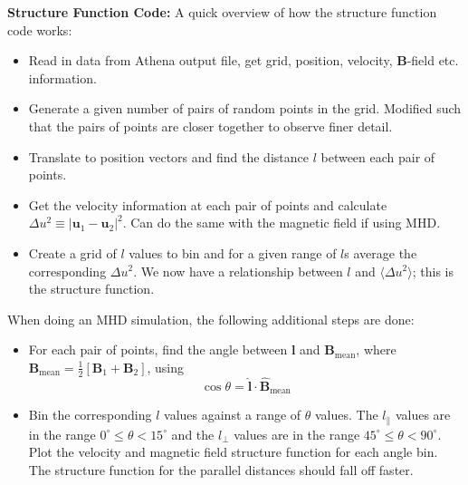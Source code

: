 \documentclass[12pt,letterpaper]{article}
\newcommand{\B}[1]{\mathbf{#1}}
\begin{document}
  \textbf{Structure Function Code:} A quick overview of how the structure function code works:
  \begin{itemize}
    \item Read in data from Athena output file, get grid, position, velocity, $\B{B}$-field etc. information.

    \item Generate a given number of pairs of random points in the grid. Modified such that the pairs of points are closer together to observe finer detail.

    \item Translate to position vectors and find the distance $l$ between each pair of points.

    \item Get the velocity information at each pair of points and calculate $\Delta u^2 \equiv |\B{u}_1 - \B{u}_2|^2$. Can do the same with the magnetic field if using MHD.

    \item Create a grid of $l$ values to bin and for a given range of $l$s average the corresponding $\Delta u^2$. We now have a relationship between $l$ and $\langle \Delta u^2 \rangle$; this is the structure function.
  \end{itemize}

  When doing an MHD simulation, the following additional steps are done:

  \begin{itemize}
    \item For each pair of points, find the angle between $\B{l}$ and $\B{B}_{\text{mean}}$, where $\B{B}_{\text{mean}} = \frac{1}{2}[\B{B}_1 + \B{B}_2]$, using
    $$
      \cos \theta = \hat{\B{l}} \cdot \hat{\B{B}}_{\text{mean}}
    $$

    \item Bin the corresponding $l$ values against a range of $\theta$ values. The $l_{\|}$ values are in the range $0^\circ\leq \theta < 15^\circ$ and the $l_\perp$ values are in the range $45^\circ\leq \theta < 90^\circ$. Plot the velocity and magnetic field structure function for each angle bin. The structure function for the parallel distances should fall off faster.
  \end{itemize}
\end{document}
